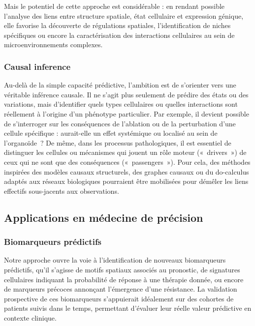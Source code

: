Mais le potentiel de cette approche est considérable : en rendant possible l’analyse des liens entre structure spatiale, état cellulaire et expression génique, elle favorise la découverte de régulations spatiales, l’identification de niches spécifiques ou encore la caractérisation des interactions cellulaires au sein de microenvironnements complexes.

\subsubsection{Causal inference}

Au-delà de la simple capacité prédictive, l’ambition est de s’orienter vers une véritable inférence causale. Il ne s’agit plus seulement de prédire des états ou des variations, mais d’identifier quels types cellulaires ou quelles interactions sont réellement à l’origine d’un phénotype particulier. Par exemple, il devient possible de s’interroger sur les conséquences de l’ablation ou de la perturbation d’une cellule spécifique : aurait-elle un effet systémique ou localisé au sein de l’organoïde ? De même, dans les processus pathologiques, il est essentiel de distinguer les cellules ou mécanismes qui jouent un rôle moteur (« drivers ») de ceux qui ne sont que des conséquences (« passengers »). Pour cela, des méthodes inspirées des modèles causaux structurels, des graphes causaux ou du do-calculus adaptés aux réseaux biologiques pourraient être mobilisées pour démêler les liens effectifs sous-jacents aux observations.

\subsection{Applications en médecine de précision}

\subsubsection{Biomarqueurs prédictifs}

Notre approche ouvre la voie à l’identification de nouveaux biomarqueurs prédictifs, qu’il s’agisse de motifs spatiaux associés au pronostic, de signatures cellulaires indiquant la probabilité de réponse à une thérapie donnée, ou encore de marqueurs précoces annonçant l’émergence d’une résistance. La validation prospective de ces biomarqueurs s’appuierait idéalement sur des cohortes de patients suivis dans le temps, permettant d’évaluer leur réelle valeur prédictive en contexte clinique.

